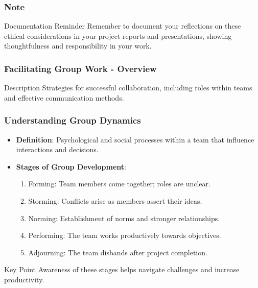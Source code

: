 \documentclass{beamer}
\begin{document}
\begin{frame}[fragile]
    \frametitle{Note}
    \begin{block}{Documentation Reminder}
        Remember to document your reflections on these ethical considerations in your project reports and presentations, showing thoughtfulness and responsibility in your work.
    \end{block}
\end{frame}

\begin{frame}[fragile]
    \frametitle{Facilitating Group Work - Overview}
    \begin{block}{Description}
        Strategies for successful collaboration, including roles within teams and effective communication methods.
    \end{block}
\end{frame}

\begin{frame}[fragile]
    \frametitle{Understanding Group Dynamics}
    \begin{itemize}
        \item \textbf{Definition}: Psychological and social processes within a team that influence interactions and decisions.
        \item \textbf{Stages of Group Development}:
        \begin{enumerate}
            \item Forming: Team members come together; roles are unclear.
            \item Storming: Conflicts arise as members assert their ideas.
            \item Norming: Establishment of norms and stronger relationships.
            \item Performing: The team works productively towards objectives.
            \item Adjourning: The team disbands after project completion.
        \end{enumerate}
    \end{itemize}
    \begin{block}{Key Point}
        Awareness of these stages helps navigate challenges and increase productivity.
    \end{block}
\end{frame}
\end{document}
